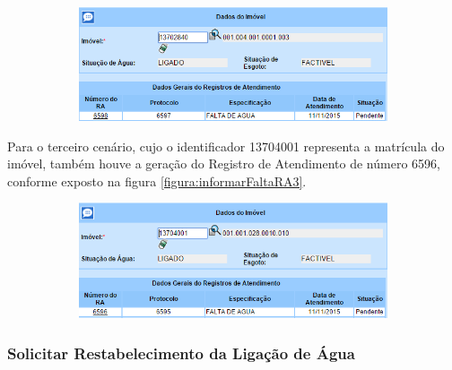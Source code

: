 \begin{figure}[H]
	\centering
	\caption{Informar Falta de Água - RA gerado para o Cenário 2}
	\label{figura:informarFaltaRA2}
	\begin{subfigure}[H]{\textwidth}
		\centering
		\includegraphics{figuras/cenarios/informar_falta_agua/resultado_2.PNG}
	\end{subfigure}
\end{figure}

Para o terceiro cenário, cujo o identificador 13704001 representa a matrícula do imóvel, também houve a geração do Registro de Atendimento de número 6596, conforme exposto na figura \ref{figura:informarFaltaRA3}.	

\begin{figure}[H]
	\centering
	\caption{Informar Falta de Água - RA gerado para o Cenário 3}
	\label{figura:informarFaltaRA3}
	\begin{subfigure}[H]{\textwidth}
		\centering
		\includegraphics{figuras/cenarios/informar_falta_agua/resultado_3.PNG}
	\end{subfigure}
\end{figure}

		
\subsubsection{Solicitar Restabelecimento da Ligação de Água}

